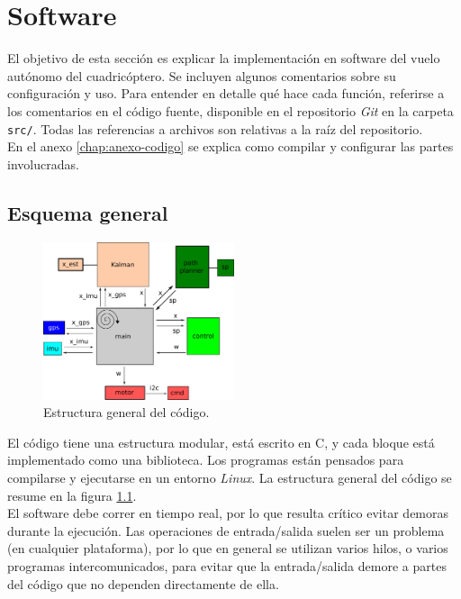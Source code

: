 \documentclass[main]{subfiles}
\begin{document}
\chapter{Software}
\label{chap:Software}

El objetivo de esta sección es explicar la implementaci\'on en software del vuelo autónomo del cuadricóptero. Se incluyen algunos comentarios sobre su configuraci\'on y uso. Para entender en detalle qué hace cada función, referirse a los comentarios en el código fuente, disponible en el repositorio \textit{Git} en la carpeta \verb+src/+. Todas las referencias a archivos son relativas a la raíz del repositorio.\\

En el anexo \ref{chap:anexo-codigo} se explica como compilar y configurar las partes involucradas.

\section{Esquema general}
\label{sec:software:esquema-general}

\begin{figure}
\vspace{-20pt}
\centering
  \includegraphics[width=0.5\textwidth]{./pics_software/code.png}
\caption{Estructura general del código.}
\vspace{-20pt}
\label{fig:codigo:code.png}
\end{figure}

El código tiene una estructura modular, está escrito en C, y cada bloque está implementado como una biblioteca. Los programas están pensados para compilarse y ejecutarse en un entorno \emph{Linux}. La estructura general del código se resume en la figura \ref{fig:codigo:code.png}.\\

El software debe correr en tiempo real, por lo que resulta cr\'itico evitar demoras durante la ejecuci\'on. Las operaciones de entrada/salida suelen ser un problema (en cualquier plataforma), por lo que en general se utilizan varios hilos, o varios programas intercomunicados, para evitar que la entrada/salida demore a partes del c\'odigo que no dependen directamente de ella.\\
\end{document}
